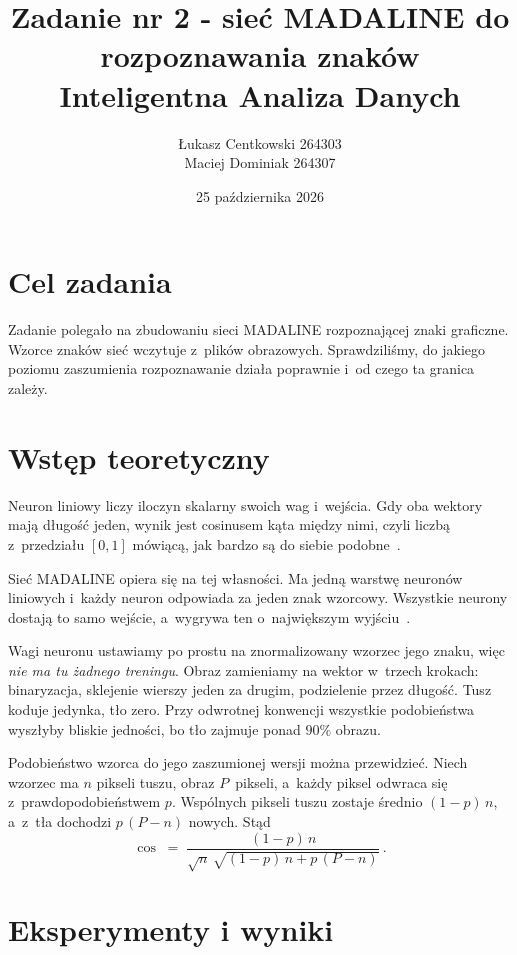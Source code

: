 \documentclass[12pt]{article}
\title{\textbf{Zadanie nr 2 - sieć MADALINE do rozpoznawania znaków}\\[2mm]
       \large Inteligentna Analiza Danych}
\author{Łukasz Centkowski 264303 \\ Maciej Dominiak 264307}
\date{25 października 2026}
\begin{document}
\maketitle
\thispagestyle{empty}
\newpage

\section{Cel zadania}

Zadanie polegało na zbudowaniu sieci MADALINE rozpoznającej znaki graficzne.
Wzorce znaków sieć wczytuje z~plików obrazowych. Sprawdziliśmy, do jakiego
poziomu zaszumienia rozpoznawanie działa poprawnie i~od czego ta granica zależy.

\section{Wstęp teoretyczny}

Neuron liniowy liczy iloczyn skalarny swoich wag i~wejścia. Gdy oba wektory mają
długość jeden, wynik jest cosinusem kąta między nimi, czyli liczbą z~przedziału
$[0,1]$ mówiącą, jak bardzo są do siebie podobne~\cite{wyklad}.

Sieć MADALINE opiera się na tej własności. Ma jedną warstwę neuronów liniowych
i~każdy neuron odpowiada za jeden znak wzorcowy. Wszystkie neurony dostają to
samo wejście, a~wygrywa ten o~największym wyjściu~\cite{widrow,osowski}.

Wagi neuronu ustawiamy po prostu na znormalizowany wzorzec jego znaku, więc
\emph{nie ma tu żadnego treningu}. Obraz zamieniamy na wektor w~trzech krokach:
binaryzacja, sklejenie wierszy jeden za drugim, podzielenie przez długość. Tusz
koduje jedynka, tło zero. Przy odwrotnej konwencji wszystkie podobieństwa
wyszłyby bliskie jedności, bo tło zajmuje ponad $90\%$ obrazu.

Podobieństwo wzorca do jego zaszumionej wersji można przewidzieć. Niech wzorzec
ma $n$ pikseli tuszu, obraz $P$~pikseli, a~każdy piksel odwraca się
z~prawdopodobieństwem $p$. Wspólnych pikseli tuszu zostaje średnio $(1-p)\,n$,
a~z~tła dochodzi $p\,(P-n)$ nowych. Stąd
\begin{equation}
\cos \;=\; \frac{(1-p)\,n}{\sqrt{n}\,\sqrt{(1-p)\,n + p\,(P-n)}}\,.
\label{eq:model}
\end{equation}

\section{Eksperymenty i wyniki}
\end{document}
